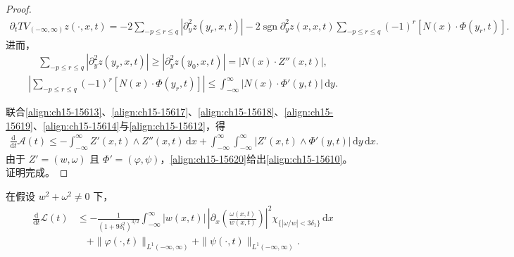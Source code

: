 \documentclass[../../main.tex]{subfiles}
\begin{document}
\begin{proof}
\begin{align}
\partial_tTV_{(-\infty,\infty)}z(\cdot,x,t)=-2\sum_{-p\leqslant r\leqslant q}|\partial_y^2z(y_r,x,t)|-2\operatorname{sgn}\partial_y^2z(x,x,t)\sum_{-p\leqslant r\leqslant q}(-1)^r[N(x)\cdot\Phi(y_r,t)].
\label{align:ch15-15617}
\end{align}
进而，
\begin{align}
\sum_{-p\leqslant r\leqslant q}|\partial_y^2z(y_r,x,t)|\geqslant|\partial_y^2z(y_0,x,t)|=|N(x)\cdot Z''(x,t)|,
\label{align:ch15-15618}
\end{align}
\begin{align}
\left|\sum_{-p\leqslant r\leqslant q}(-1)^r[N(x)\cdot\Phi(y_r,t)]\right|\leqslant\int_{-\infty}^{\infty}|N(x)\cdot\Phi'(y,t)|\,\mathrm{d}y.
\label{align:ch15-15619}
\end{align}

联合\eqref{align:ch15-15613}、\eqref{align:ch15-15617}、\eqref{align:ch15-15618}、\eqref{align:ch15-15619}、\eqref{align:ch15-15614}与\eqref{align:ch15-15612}，得
\begin{align}
\frac{\mathrm{d}}{\mathrm{d}t}\mathscr{A}(t)\leqslant-\int_{-\infty}^{\infty}Z'(x,t)\wedge Z''(x,t)\,\mathrm{d}x+\int_{-\infty}^{\infty}\int_{-\infty}^{\infty}|Z'(x,t)\wedge\Phi'(y,t)|\,\mathrm{d}y\,\mathrm{d}x.
\label{align:ch15-15620}
\end{align}
由于 $Z'=(w,\omega)$ 且 $\Phi'=(\varphi,\psi)$，\eqref{align:ch15-15620}给出\eqref{align:ch15-15610}。证明完成。
\end{proof}

\begin{lemma}\label{lemma:ch15-长度泛函估计}
在假设 $w^2+\omega^2\neq0$ 下，
\begin{align}
\frac{\mathrm{d}}{\mathrm{d}t}\mathscr{L}(t)&\leqslant-\frac1{(1+9\delta_1^2)^{3/2}}\int_{-\infty}^{\infty}|w(x,t)|\,\left|\partial_x\left(\frac{\omega(x,t)}{w(x,t)}\right)\right|^2\chi_{\{|\omega/w|<3\delta_1\}}\,\mathrm{d}x\nonumber\\
&\quad+\|\varphi(\cdot,t)\|_{L^1(-\infty,\infty)}+\|\psi(\cdot,t)\|_{L^1(-\infty,\infty)}.
\label{align:ch15-15621}
\end{align}
\end{lemma}
\end{document}
